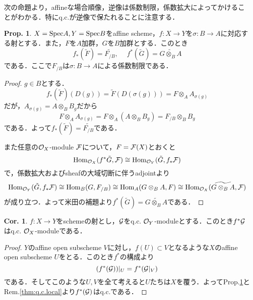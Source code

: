 \documentclass[dvipdfmx,b5paper,papersize]{jsarticle}
\theoremstyle{definition}
\newtheorem{prop}[thm]{Prop.}
\newtheorem{cor}[thm]{Cor.}
\begin{document}
次の命題より，affineな場合順像，逆像は係数制限，係数拡大によってかけることがわかる．特にq.c.が逆像で保たれることに注意する．
\begin{prop}\label{thm:associated}
  $X={\rm Spec}{A},Y={\rm Spec}{B}$をaffine scheme，$f:X \to Y$を$\sigma:B \to A$に対応する射とする．また，$F$を$A$加群，$G$を$B$加群とする．このとき
  \[
    f_*({\tilde F})={\widetilde {F_{/B}}}, \hspace{15pt} f^*({\tilde G})={\widetilde {G \otimes_B A}}
  \]
  である．ここで${F_{/B}}$は$\sigma:B \to A$による係数制限である．
\end{prop}
\begin{proof}
  $g \in B$とする．
  \[
    f_*({\tilde F})(D(g))={\tilde F}(D(\sigma(g)))=F\otimes_A A_{\sigma(g)}
  \]
  だが，$A_{\sigma(g)}=A\otimes_B B_g$だから
  \[
    F\otimes_A A_{\sigma(g)}=F\otimes_A (A\otimes_B B_g)=F_{/B}\otimes_B B_g
  \]
  である．よって$f_*({\tilde F})={\widetilde {F_{/B}}}$である．

  また任意の${\cal{O}}_X$-module ${\cal{F}}$について，$F={\cal{F}}(X)$とおくと
  \[
    {\rm Hom}_{{\cal{O}}_X}(f^*{\tilde G},{\cal{F}})\cong {\rm Hom}_{{\cal{O}}_Y}({\tilde G},f_*{{\cal{F}}})
  \]
  で，係数拡大およびsheafの大域切断に伴うadjointより
  \[
    {\rm Hom}_{{\cal{O}}_Y}({\tilde G},f_*{{\cal{F}}})\cong {\rm Hom}_{B}(G,F_{/B})\cong {\rm Hom}_{A}(G\otimes_B A,F)\cong {\rm Hom}_{{\cal{O}}_X}({\widetilde {G \otimes_B A}},{\cal{F}})
  \]
  が成り立つ．よって米田の補題より$f^*({\tilde G})={\widetilde {G \otimes_B A}}$である．
\end{proof}
\begin{cor}\label{thm:invese_q.c.}
  $f:X\to Y$をschemeの射とし，$\cal{G}$をq.c. ${\cal{O}}_Y$-moduleとする．このとき$f^*{\cal{G}}$はq.c. ${\cal{O}}_X$-moduleである．
\end{cor}
\begin{proof}
  $Y$のaffine open subscheme $V$に対し，$f(U) \subset V$となるような$X$のaffine open subscheme $U$をとる．このとき$f^*$の構成より
  \[
    (f^*({\cal{G}}))|_U=f^*({\cal{G}}|_V)
  \]
  である．そしてこのような$U,V$を全て考えると$U$たちは$X$を覆う．よってProp.\ref{thm:associated}とRem.\ref{thm:q.c.local}より$f^*({\cal{G}})$はq.c.である．

\end{proof}
\end{document}
